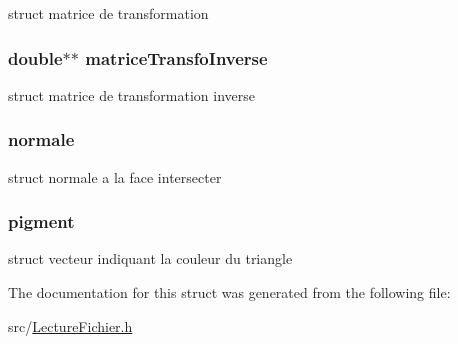 \label{structtriangle_aa06ccc348007e3355beccf412f2f656c}
struct matrice de transformation \hypertarget{structtriangle_acd7a3590501dcccfaefccbb658f83821}{
\subsubsection[{matriceTransfoInverse}]{\setlength{\rightskip}{0pt plus 5cm}double$\ast$$\ast$ {\bf matriceTransfoInverse}}}
\label{structtriangle_acd7a3590501dcccfaefccbb658f83821}
struct matrice de transformation inverse \hypertarget{structtriangle_a944738f40a0294270a0047acc5a77ee2}{
\subsubsection[{normale}]{ {\bf normale}}}
\label{structtriangle_a944738f40a0294270a0047acc5a77ee2}
struct normale a la face intersecter \hypertarget{structtriangle_a5a4ee24431a1811fa1c8b75844198987}{
\subsubsection[{pigment}]{ {\bf pigment}}}
\label{structtriangle_a5a4ee24431a1811fa1c8b75844198987}
struct vecteur indiquant la couleur du triangle 

The documentation for this struct was generated from the following file:\begin{DoxyCompactItemize}
\item 
src/\hyperlink{_lecture_fichier_8h}{LectureFichier.h}\end{DoxyCompactItemize}

